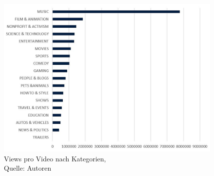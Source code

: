 \documentclass[12pt,titlepage]{article}
\begin{document}
\begin{figure}[h]
	\centering
	\includegraphics[width=14cm]{IMG/grafik_ViewsProVid.JPG}
	\caption[Views pro Video nach Kategorien]{Views pro Video nach Kategorien,\\ Quelle: Autoren}
	\label{img:Views pro Video nach Kategorien}
\end{figure}
\end{document}
